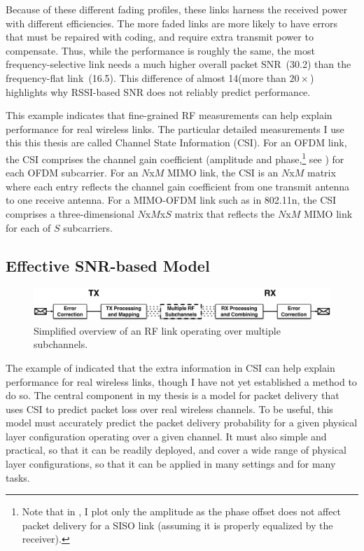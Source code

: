 Because of these different fading profiles, these links harness the received power with different efficiencies.
The more faded links are more likely to have errors that must be repaired with coding, and require extra transmit power to compensate. Thus, while the performance is roughly the same, the most frequency-selective link needs a much higher overall packet SNR~(30.2\dB) than the frequency-flat link~(16.5\dB). This difference of almost 14\dB (more than $20\times$) highlights why RSSI-based SNR does not reliably predict performance.

This example indicates that fine-grained RF measurements can help explain performance for real wireless links. The particular detailed measurements I use this this thesis are called Channel State Information (CSI). For an OFDM link, the CSI comprises the channel gain coefficient (amplitude and phase,\footnote{Note that in , I plot only the amplitude as the phase offset does not affect packet delivery for a SISO link (assuming it is properly equalized by the receiver).} see ) for each OFDM subcarrier. For an $N$x$M$ MIMO link, the CSI is an $N$x$M$ matrix where each entry reflects the channel gain coefficient from one transmit antenna to one receive antenna. For a MIMO-OFDM link such as in 802.11n, the CSI comprises a three-dimensional $N$x$M$x$S$ matrix that reflects the $N$x$M$ MIMO link for each of $S$ subcarriers.

\subsection{Effective SNR-based Model}
\begin{figure}[t!]
	\centering
	\includegraphics[width=\textwidth]{figures/esnr_intuitive.pdf}
	\caption{\label{fig:esnr_intuitive}Simplified overview of an RF link operating over multiple subchannels.}
\end{figure}

The example of  indicated that the extra information in CSI can help explain performance for real wireless links, though I have not yet established a method to do so. The central component in my thesis is a model for packet delivery that uses CSI to predict packet loss over real wireless channels. To be useful, this model must accurately predict the packet delivery probability for a given physical layer configuration operating over a given channel. It must also simple and practical, so that it can be readily deployed, and cover a wide range of physical layer configurations, so that it can be applied in many settings and for many tasks.

